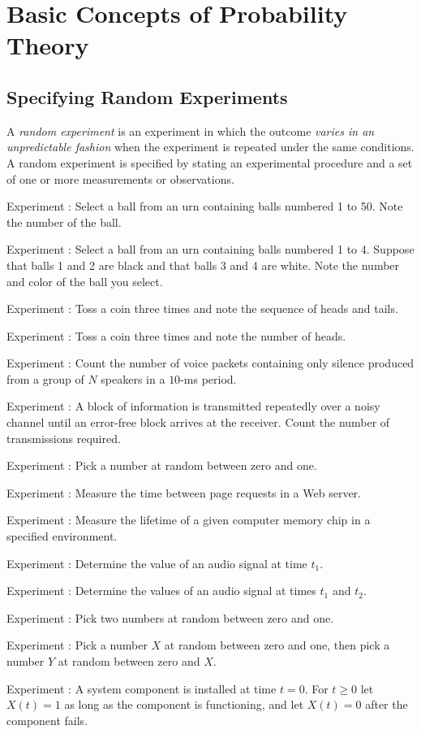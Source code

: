 
\chapter{Basic Concepts of Probability Theory}

\section{Specifying Random Experiments}

\bit
	\item A \emph{random experiment} is an experiment
	in which the outcome \emph{varies in an unpredictable fashion}
	when the experiment is repeated under the same conditions.
	A random experiment is specified by stating an experimental procedure and a set of one or more measurements or observations.

	\item {}
	\bit
		\item Experiment : Select a ball from an urn containing balls numbered 1 to 50. Note the number of the ball.
		\item Experiment : Select a ball from an urn containing balls numbered 1 to 4. Suppose that balls 1 and 2 are black and that balls 3 and 4 are white. Note the number and color of the ball you select.
		\item Experiment : Toss a coin three times and note the sequence of heads and tails.
		\item Experiment : Toss a coin three times and note the number of heads.
		\item Experiment : Count the number of voice packets containing only silence produced from a group of $N$ speakers in a $10$-ms period.
		\item Experiment : A block of information is transmitted repeatedly over a noisy channel until an error-free block arrives at the receiver. Count the number of transmissions required.
		\item Experiment : Pick a number at random between zero and one.
		\item Experiment : Measure the time between page requests in a Web server.
		\item Experiment : Measure the lifetime of a given computer memory chip in a specified environment.
		\item Experiment : Determine the value of an audio signal at time $t_1$.
		\item Experiment : Determine the values of an audio signal at times $t_1$ and $t_2$.
		\item Experiment : Pick two numbers at random between zero and one.
		\item Experiment : Pick a number $X$ at random between zero and one, then pick a number $Y$ at random between zero and $X$.
		\item Experiment : A system component is installed at time $t = 0$. For $t \geq 0$ let $X(t) = 1$ as long as the component is functioning, and let $X(t) = 0$ after the component fails.
	\eit


